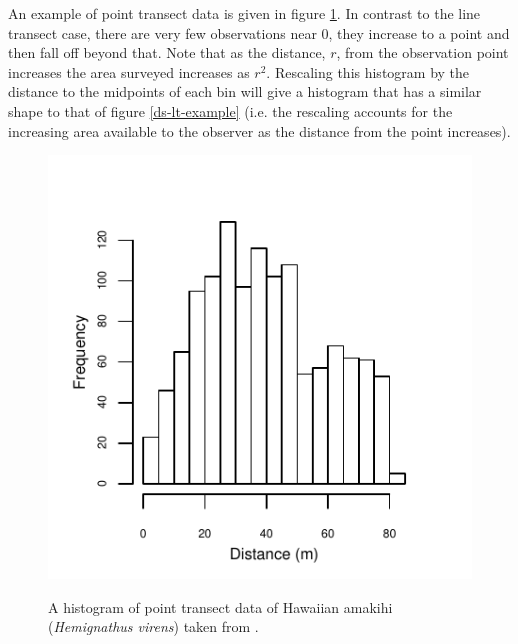 An example of point transect data is given in figure \ref{ds-pt-example}. In contrast to the line transect case, there are very few observations near 0, they increase to a point and then fall off beyond that. Note that as the distance, $r$, from the observation point increases the area surveyed increases as $r^2$. Rescaling this histogram by the distance to the midpoints of each bin will give a histogram that has a similar shape to that of figure \ref{ds-lt-example} (i.e. the rescaling accounts for the increasing area available to the observer as the distance from the point increases).

\begin{figure}
\centering
\includegraphics{intro/figs/pt-data-example.pdf}\\
\caption{A histogram of point transect data of Hawaiian amakihi (\textit{Hemignathus virens}) taken from .}
\label{ds-pt-example}
\end{figure}


